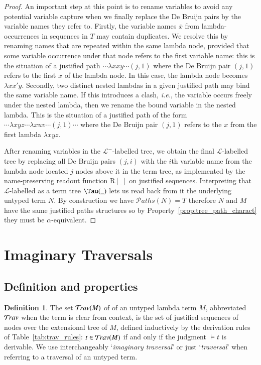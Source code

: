 \documentclass{elsarticle}
\makeatletter
\theoremstyle{plain}
\theoremstyle{definition}
\newtheorem{definition}{Definition}[section]
\newcommand{\travulc}{\travset}
\def\readout{\mathrm{R}} %
\newcommand{\ctree}{\Tau} %
\newcommand\pathset{{\mathcal{P}aths}} %
\renewcommand\ie{{\it i.e.\@\xspace}}
\def\istraversal{\models}
\makeatother
\begin{document}
\begin{proof}
An important step at this point is to rename variables to avoid any potential variable capture when we finally replace the De Bruijn pairs by the variable names they refer to.
%
Firstly, the variable names $\overline{x}$ from lambda-occurrences in sequences in $T$ may contain duplicates. We resolve this by renaming names that are repeated within the same lambda node, provided that some variable occurrence under that node refers to the first variable name: this is the situation of a justified path  $\cdots \lambda x x y \cdots (j,1)$ where the De Bruijn pair $(j,1)$ refers to the first $x$ of the lambda node. In this case, the lambda node becomes $\lambda x x' y$.
%
Secondly, two distinct nested lambdas in a given justified path may bind the same variable name. If this introduces a clash, \ie, the variable occurs freely under the nested lambda, then we rename the bound variable in the nested lambda. This is the situation of a justified path of the form $\cdots \lambda{xyz} \cdots \lambda {xuv} \cdots (j,1) \cdots$
 where the De Bruijn pair $(j,1)$ refers to the $x$ from the first lambda $\lambda{x y z}$.

After renaming variables in the $\mathcal{L^-}$-labelled tree, we obtain the final $\mathcal{L}$-labelled tree by replacing all De Bruijn pairs $(j,i)$ with the $i$th variable name from the lambda node located $j$ nodes above it in the term tree, as implemented by the name-preserving readout function $\readout[\_]$ on justified sequences.
%
Interpreting that $\mathcal{L}$-labelled as a term tree $\ctree(\_ )$ lets us read back from it the underlying untyped term $N$.
%
By construction we have $\pathset(N) = T$ therefore
$N$ and $M$ have the same justified paths structures so by
Property~\ref{prop:tree_path_charact} they must be $\alpha$-equivalent.
\end{proof}


\section{Imaginary Traversals}
\label{sec:imaginary_traversals}
\subsection{Definition and properties}

\begin{definition}
The set $\travulc(M)$ of  of an untyped lambda term $M$, abbreviated $\travulc$ when the term is clear from context, is the set of justified sequences of nodes over the extensional tree of $M$, defined inductively by the derivation rules of Table~\ref{tab:trav_rules}:
 $t \in \travulc(M)$ if and only if the judgment $\istraversal t$
 is derivable.
%
 We use interchangeably `\emph{imaginary traversal}' or just `\emph{traversal}' when referring to a traversal of an untyped term.
\end{definition}
\end{document}
